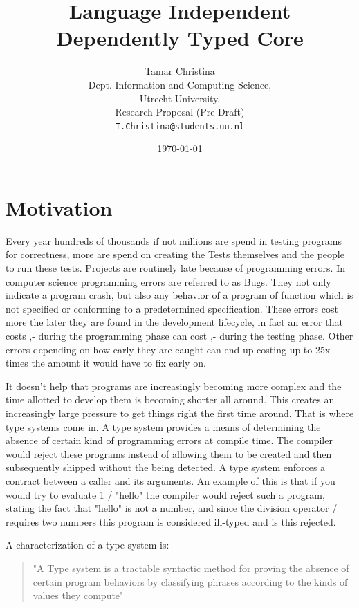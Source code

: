 \documentclass[11pt,twoside,a4paper]{article}
\begin{document}
\title{Language Independent Dependently Typed Core}
 \author{Tamar Christina\\
 Dept. Information and Computing Science,\\
 Utrecht University,\\
 Research Proposal (Pre-Draft) \\
 \texttt{T.Christina@students.uu.nl}}
 \date{\today}
 \maketitle

\section{Motivation}
Every year hundreds of thousands if not millions are spend in testing programs for correctness, more are spend on creating the Tests themselves and the people to run these tests. Projects are routinely late because of programming errors. In computer science programming errors are referred to as Bugs. They not only indicate a program crash, but also any behavior of a program of function which is not specified or conforming to a predetermined specification. These errors cost more the later they are found in the development lifecycle\cite{code}, in fact an error that costs ,- during the programming phase can cost ,- during the testing phase.  Other errors depending on how early they are caught can end up costing up to 25x times the amount it would have to fix early on.

It doesn't help that programs are increasingly becoming more complex and the time allotted to develop them is becoming shorter all around. This creates an increasingly large pressure to get things right the first time around. That is where type systems come in. A type system provides a means of determining the absence of certain kind of programming errors at compile time. The compiler would reject these programs instead of allowing them to be created and then subsequently shipped without the being detected.  A type system enforces a contract between a caller and its arguments. An example of this is that if you would try to evaluate 1 / "hello" the compiler would reject such a program, stating the fact that "hello" is not a number, and since the division operator / requires two numbers this program is considered ill-typed and is this rejected. 

A characterization of a type system is: \begin{quote}
"A Type system is a tractable syntactic method for proving the absence of certain program behaviors by classifying phrases according to the kinds of values they compute"\cite{pierce}
\end{quote}
\end{document}
